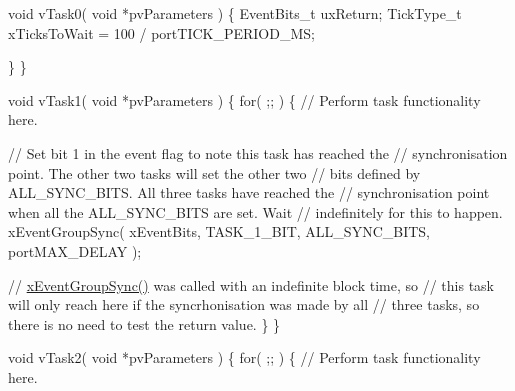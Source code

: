 \begin{DoxyPre}void vTask0( void *pvParameters )
\{
EventBits\_t uxReturn;
TickType\_t xTicksToWait = 100 / portTICK\_PERIOD\_MS;
\begin{DoxyVerb}for( ;; )
{
// Perform task functionality here.

// Set bit 0 in the event flag to note this task has reached the
// sync point.  The other two tasks will set the other two bits defined
// by ALL_SYNC_BITS.  All three tasks have reached the synchronisation
// point when all the ALL_SYNC_BITS are set.  Wait a maximum of 100ms
// for this to happen.
uxReturn = xEventGroupSync( xEventBits, TASK_0_BIT, ALL_SYNC_BITS, xTicksToWait );

if( ( uxReturn & ALL_SYNC_BITS ) == ALL_SYNC_BITS )
{
    // All three tasks reached the synchronisation point before the call
    // to xEventGroupSync() timed out.
}
\end{DoxyVerb}

   \}
\}\end{DoxyPre}



\begin{DoxyPre}void vTask1( void *pvParameters )
\{
    for( ;; )
    \{
    // Perform task functionality here.\end{DoxyPre}



\begin{DoxyPre}    // Set bit 1 in the event flag to note this task has reached the
    // synchronisation point.  The other two tasks will set the other two
    // bits defined by ALL\_SYNC\_BITS.  All three tasks have reached the
    // synchronisation point when all the ALL\_SYNC\_BITS are set.  Wait
    // indefinitely for this to happen.
    xEventGroupSync( xEventBits, TASK\_1\_BIT, ALL\_SYNC\_BITS, portMAX\_DELAY );\end{DoxyPre}



\begin{DoxyPre}    // \hyperlink{event__groups_8h_a869511456b86426f52e2eec898bff341}{xEventGroupSync()} was called with an indefinite block time, so
    // this task will only reach here if the syncrhonisation was made by all
    // three tasks, so there is no need to test the return value.
    \}
\}\end{DoxyPre}



\begin{DoxyPre}void vTask2( void *pvParameters )
\{
    for( ;; )
    \{
    // Perform task functionality here.\end{DoxyPre}



